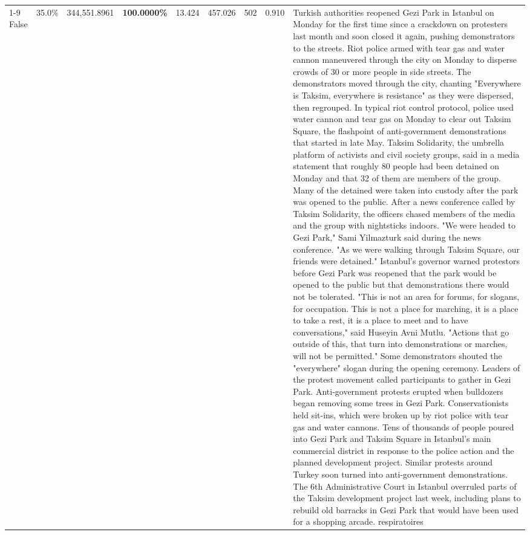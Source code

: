 \begin{table}[H]
\begin{tabular}{lllrlllll}
\cline{1-9}
False & 35.0\% & 344,551.8961 & \bfseries \color{red} 100.0000\% & 13.424 & 457.026 & 502 & 0.910 & Turkish authorities reopened Gezi Park in Istanbul on Monday for the first time since a crackdown on protesters last month and soon closed it again, pushing demonstrators to the streets. Riot police armed with tear gas and water cannon maneuvered through the city on Monday to disperse crowds of 30 or more people in side streets. The demonstrators moved through the city, chanting "Everywhere is Taksim, everywhere is resistance" as they were dispersed, then regrouped. In typical riot control protocol, police used water cannon and tear gas on Monday to clear out Taksim Square, the flashpoint of anti-government demonstrations that started in late May. Taksim Solidarity, the umbrella platform of activists and civil society groups, said in a media statement that roughly 80 people had been detained on Monday and that 32 of them are members of the group. Many of the detained were taken into custody after the park was opened to the public. After a news conference called by Taksim Solidarity, the officers chased members of the media and the group with nightsticks indoors. "We were headed to Gezi Park," Sami Yilmazturk said during the news conference. "As we were walking through Taksim Square, our friends were detained." Istanbul's governor warned protestors before Gezi Park was reopened that the park would be opened to the public but that demonstrations there would not be tolerated. "This is not an area for forums, for slogans, for occupation. This is not a place for marching, it is a place to take a rest, it is a place to meet and to have conversations," said Huseyin Avni Mutlu. "Actions that go outside of this, that turn into demonstrations or marches, will not be permitted." Some demonstrators shouted the "everywhere" slogan during the opening ceremony. Leaders of the protest movement called participants to gather in Gezi Park. Anti-government protests erupted when bulldozers began removing some trees in Gezi Park. Conservationists held sit-ins, which were broken up by riot police with tear gas and water cannons. Tens of thousands of people poured into Gezi Park and Taksim Square in Istanbul's main commercial district in response to the police action and the planned development project. Similar protests around Turkey soon turned into anti-government demonstrations. The 6th Administrative Court in Istanbul overruled parts of the Taksim development project last week, including plans to rebuild old barracks in Gezi Park that would have been used for a shopping arcade. respiratoires \\

\end{tabular}
\end{table}
